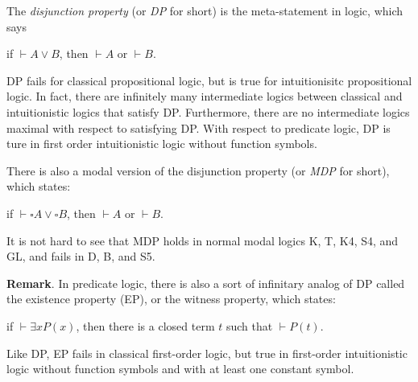\documentclass[12pt]{article}
\begin{document}
The \emph{disjunction property} (or \emph{DP} for short) is the meta-statement in logic, which says
\begin{center}
if $\vdash A \lor B$, then $\vdash A$ or $\vdash B$.
\end{center}
DP fails for classical propositional logic, but is true for intuitionisitc propositional logic.  In fact, there are infinitely many intermediate logics between classical and intuitionistic logics that satisfy DP.  Furthermore, there are no intermediate logics maximal with respect to satisfying DP.  With respect to predicate logic, DP is ture in first order intuitionistic logic without function symbols.

There is also a modal version of the disjunction property (or \emph{MDP} for short), which states:
\begin{center}
if $\vdash \square A \lor \square B$, then $\vdash A$ or $\vdash B$.
\end{center}
It is not hard to see that MDP holds in normal modal logics K, T, K4, S4, and GL, and fails in D, B, and S5.

\textbf{Remark}.  In predicate logic, there is also a sort of infinitary analog of DP called the existence property (EP), or the witness property, which states:
\begin{center}
if $\vdash \exists x P(x)$, then there is a closed term $t$ such that $\vdash P(t)$.
\end{center}
Like DP, EP fails in classical first-order logic, but true in first-order intuitionistic logic without function symbols and with at least one constant symbol.

\end{document}
